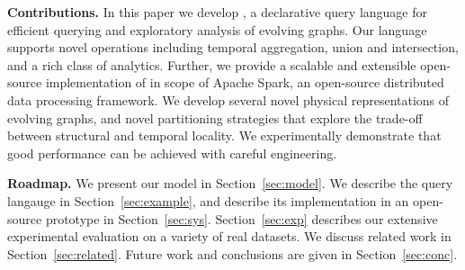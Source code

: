 {\bf Contributions.} In this paper we develop \ql, a declarative query
language for efficient querying and exploratory analysis of evolving
graphs. Our language supports novel operations including temporal
aggregation, union and intersection, and a rich class of analytics.
Further, we provide a scalable and extensible open-source
implementation of \ql in scope of Apache Spark, an open-source
distributed data processing framework.  We develop several novel
physical representations of evolving graphs, and novel partitioning
strategies that explore the trade-off between structural and temporal
locality.  We experimentally demonstrate that good performance can be
achieved with careful engineering.

{\bf Roadmap.}  We present our model in Section~\ref{sec:model}.  We
describe the \ql query langauge in Section~\ref{sec:example}, and
describe its implementation in an open-source prototype in
Section~\ref{sec:sys}.  Section~\ref{sec:exp} describes our extensive
experimental evaluation on a variety of real datasets.  We discuss
related work in Section~\ref{sec:related}.  Future work and
conclusions are given in Section~\ref{sec:conc}.

